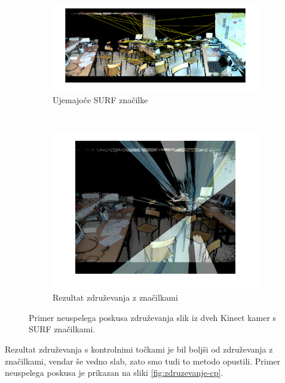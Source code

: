\begin{figure}[!htb]
	\centering
	\begin{subfigure}[t]{0.45\columnwidth}
		\includegraphics[width=\columnwidth]{./Slike/matched-features.png}
		\caption{Ujemajoče SURF značilke}
		\label{fig:zdruzevanje-surf}
	\end{subfigure}
	~
	\begin{subfigure}[t]{0.45\columnwidth}
		\includegraphics[width=\columnwidth]{./Slike/features-calibration-result.png}
		\caption{Rezultat združevanja z značilkami}
		\label{fig:zdruzevanje-result}
	\end{subfigure}
	\caption[Neuspelo združevanje slik s SURF značilkami]{Primer neuspelega poskusa združevanja slik iz dveh Kinect kamer s SURF značilkami.}
	\label{fig:zdruzevanje-znacilke}
\end{figure}

 Rezultat združevanja s kontrolnimi točkami je bil boljši od združevanja z značilkami, vendar še vedno slab, zato smo tudi to metodo opustili. Primer neuspelega poskusa je prikazan na sliki \ref{fig:zdruzevanje-cp}.
 
